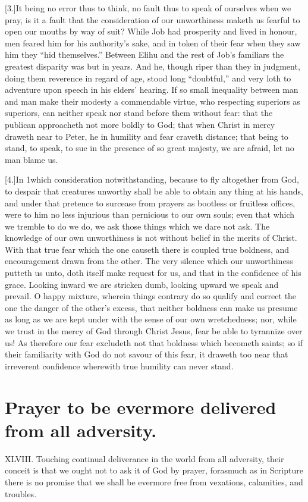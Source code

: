 [3.]It being no error thus to think, no fault thus to speak of ourselves when we pray, is it a fault that the consideration of our unworthiness maketh us fearful to open our mouths by way of suit? While Job had prosperity and lived in honour, men feared him for his authority’s sake, and in token of their fear when they saw him they “hid themselves.” Between Elihu and the rest of Job’s familiars the greatest disparity was but in years. And he, though riper than they in judgment, doing them reverence in regard of age, stood long “doubtful,” and very loth to adventure upon speech in his elders’ hearing. If so small inequality between man and man make their modesty a commendable virtue, who respecting superiors as superiors, can neither speak nor stand before them without fear: that the publican approacheth not more boldly to God; that when Christ in mercy draweth near to Peter, he in humility and fear craveth distance; that being to stand, to speak, to sue in the presence of so great majesty, we are afraid, let no man blame us.




[4.]In 1which consideration notwithstanding, because to fly altogether from God, to despair that creatures unworthy shall be able to obtain any thing at his hands, and under that pretence to surcease from prayers as bootless or fruitless offices, were to him no less injurious than pernicious to our own souls; even that which we tremble to do we do, we ask those things which we dare not ask. The knowledge of our own unworthiness is not without belief in the merits of Christ. With that true fear which the one causeth there is coupled true boldness, and encouragement drawn from the other. The very silence which our unworthiness putteth us unto, doth itself make request for us, and that in the confidence of his grace. Looking inward we are stricken dumb, looking upward we speak and prevail. O happy mixture, wherein things contrary do so qualify and correct the one the danger of the other’s excess, that neither boldness can make us presume as long as we are kept under with the sense of our own wretchedness; nor, while we trust in the mercy of God through Christ Jesus, fear be able to tyrannize over us! As therefore our fear excludeth not that boldness which becometh saints; so if their familiarity with God do not savour of this fear, it draweth too near that irreverent confidence wherewith true humility can never stand.


\section*{Prayer to be evermore delivered from all adversity.}
XLVIII. Touching continual deliverance in the world from all adversity, their conceit is that we ought not to ask it of God by prayer, forasmuch as in Scripture there is no promise that we shall be evermore free from vexations, calamities, and troubles.




